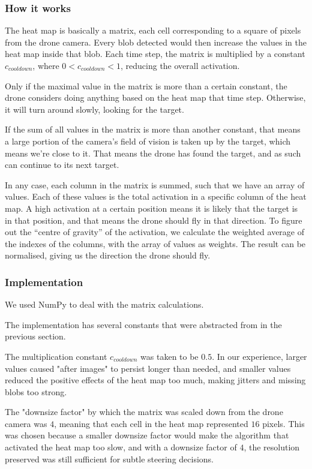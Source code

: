 \documentclass[a4paper,10pt]{article}
\begin{document}
\subsubsection{How it works}\label{subsec:howheatmapworks}
The heat map is basically a matrix, each cell corresponding to a square of
pixels from the drone camera. Every blob detected would then increase the
values in the heat map inside that blob. Each time step, the matrix is
multiplied by a constant $c_{{cooldown}}$, where
$0 < c_{{cooldown}} < 1$, reducing the overall
activation.

Only if the maximal value in the matrix is more than a certain constant,
the drone considers doing anything based on the heat map that time step.
Otherwise, it will turn around slowly, looking for the target.

If the sum of all values in the matrix is more than another constant,
that means a large portion of the camera's field of vision is taken up
by the target, which means we're close to it. That means the drone has
found the target, and as such can continue to its next target.

In any case, each column in the matrix is summed, such that we have an
array of values. Each of these values is the total activation in a specific
column of the heat map. A high activation at a certain position means it is
likely that the target is in that position, and that means the drone should
fly in that direction. To figure out the ``centre of gravity'' of the
activation, we calculate the weighted average of the indexes of the columns,
with the array of values as weights. The result can be normalised, giving us
the direction the drone should fly.
\subsubsection{Implementation}
We used NumPy to deal with the matrix calculations.

The implementation has several constants that were abstracted from in the
previous section.

The multiplication constant $c_{{cooldown}}$ was taken to be
$0.5$. In our experience, larger values caused "after images" to persist
longer than needed, and smaller values reduced the positive effects of
the heat map too much, making jitters and missing blobs too strong.

The "downsize factor" by which the matrix was scaled down from the
drone camera was $4$, meaning that each cell in the heat map represented $16$
pixels. This was chosen because a smaller downsize factor would make the
algorithm that activated the heat map too slow, and with a downsize factor of
$4$, the resolution preserved was still sufficient for subtle steering
decisions.
\end{document}
